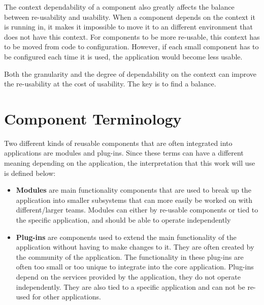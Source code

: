 The context dependability of a component also greatly affects the balance between re-usability and usability. When a component depends on the context it is running in, it makes it impossible to move it to an different environment that does not have this context. For components to be more re-usable, this context has to be moved from code to configuration. However, if each small component has to be configured each time it is used, the application would become less usable.

Both the granularity and the degree of dependability on the context can improve the re-usability at the cost of usability. The key is to find a balance.

\newpage

\section{Component Terminology} %

Two different kinds of reusable components that are often integrated into applications are modules and plug-ins. Since these terms can have a different meaning depending on the application, the interpretation that this work will use is defined below:

\begin{itemize}
	\item \textbf{Modules} are main functionality components that are used to break up the application into smaller subsystems that can more easily be worked on with different/larger teams. Modules can either by re-usable components or tied to the specific application, and should be able to operate independently
	\item 
	\textbf{Plug-ins} are components used to extend the main functionality of the application without having to make changes to it. They are often created by the community of the application. The functionality in these plug-ins are often too small or too unique to integrate into the core application. Plug-ins depend on the services provided by the application, they do not operate independently. They are also tied to a specific application and can not be re-used for other applications.
\end{itemize}

